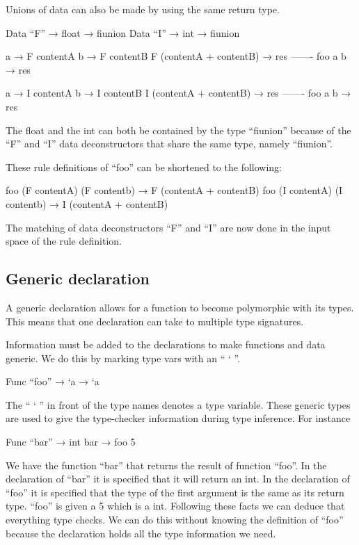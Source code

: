 Unions of data can also be made by using the same return type.


\begin{code}
	Data “F” → float → fiunion
	Data “I” → int → fiunion
	
	a → F contentA
	b → F contentB
	F (contentA + contentB) → res
	-------
	foo a b → res
	
	a → I contentA
	b → I contentB
	I (contentA + contentB) → res
	-------
	foo a b → res
\end{code}

The float and the int can both be contained by the type “fiunion” because of the “F” and “I” data deconstructors that share the same type, namely “fiunion”.

These rule definitions of “foo” can be shortened to the following:


\begin{code}
	foo (F contentA) (F contentb) → F (contentA + contentB)
	foo (I contentA) (I contentb) → I (contentA + contentB)
\end{code}

The matching of data deconstructors “F” and “I” are now done in the input space of the rule definition.

\subsection{Generic declaration}

A generic declaration allows for a function to become polymorphic with its types. 
This means that one declaration can take to multiple type signatures.

Information must be added to the declarations to make functions and data generic. 
We do this by marking type vars with an “ ` ”.

\begin{code}
	Func “foo” → `a → `a
\end{code}

The “ ` ” in front of the type names denotes a type variable. 
These generic types are used to give the type-checker information during type inference. 
For instance


\begin{code}
	Func “bar” → int
	bar → foo 5
\end{code}

We have the function “bar” that returns the result of function “foo”. 
In the declaration of “bar” it is specified that it will return an int. 
In the declaration of “foo” it is specified that the type of the first argument is the same as its return type. 
“foo” is given a 5 which is a int. 
Following these facts we can deduce that everything type checks. 
We can do this without knowing the definition of “foo” because the declaration holds all the type information we need.

